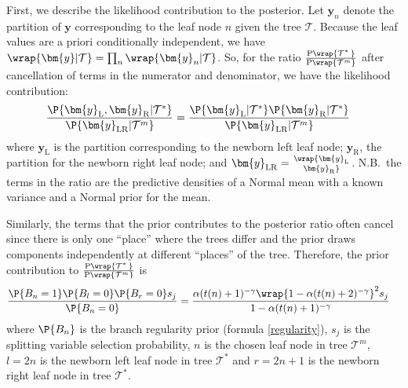 \documentclass[cmbright,doublespace]{WileySTAT-V1}
\theoremstyle{plain}
\begin{document}
First, we describe the likelihood contribution to the posterior.  Let
$\bm{y}_n$ denote the partition of $\bm{y}$ corresponding to the leaf
node $n$ given the tree $\mathcal{T}$.  Because the leaf values are a
priori conditionally independent, we have
$\wrap{\bm{y}|\mathcal{T}}=\prod_n\wrap{\bm{y}_n|\mathcal{T}}$.  So,
for the ratio $\frac{\mathrm{P}\wrap{\mathcal{T}^*\,}}{\mathrm{P}\wrap{\mathcal{T}^m}}$ after
cancellation of terms in the numerator and denominator, we have
the likelihood contribution:
\begin{align*}
\frac{\P{\bm{y}_{\mathrm{L}},\bm{y}_{\mathrm{R}}|\mathcal{T}^*}}
{\P{\bm{y}_{\mathrm{LR}}|\mathcal{T}^m}}
&=\frac{\P{\bm{y}_{\mathrm{L}}|\mathcal{T}^*}
\P{\bm{y}_{\mathrm{R}}|\mathcal{T}^*}}
{\P{\bm{y}_{\mathrm{LR}}|\mathcal{T}^m}}
\end{align*}
where $\bm{y}_{\mathrm{L}}$ is the partition corresponding to the
newborn left leaf node; $\bm{y}_{\mathrm{R}}$, the partition for the
newborn right leaf node; and
$\bm{y}_{\mathrm{LR}}=\wrap{\bm{y}_{\mathrm{L}} \atop \bm{y}_{\mathrm{R}}}$.
N.B.\ the terms in the ratio are the predictive densities of a Normal
mean with a known variance and a Normal prior for the mean.

Similarly, the terms that the prior contributes to the posterior ratio
often cancel since there is only one ``place'' where the trees differ
and the prior draws components independently at different ``places''
of the tree.  Therefore, the prior contribution to
$\frac{\mathrm{P}\wrap{\mathcal{T}^*\,}}{\mathrm{P}\wrap{\mathcal{T}^m}}$ is 
\begin{align*}
\frac{\P{B_n=1}\P{B_l=0} \P{B_r=0} s_j} {\P{B_n=0}} & =
\frac{\alpha(t(n)+1)^{-\gamma}\wrap{1-\alpha(t(n)+2)^{-\gamma}}^2 s_j}
{1-\alpha(t(n)+1)^{-\gamma}}
\end{align*}
where $\P{B_n}$ is the branch regularity prior (formula
\eqref{regularity}), $s_j$ is the splitting variable selection
probability, $n$ is the chosen leaf node in tree $\mathcal{T}^m$,
$l=2n$ is the newborn left leaf node in tree $\mathcal{T}^*$ and
$r=2n+1$ is the newborn right leaf node in tree $\mathcal{T}^*$.
\end{document}
